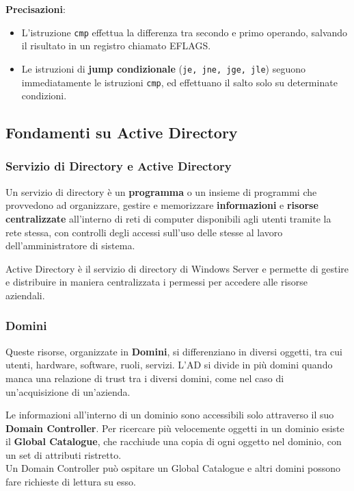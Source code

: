 \documentclass{article}
\begin{document}
\textbf{Precisazioni}:
\begin{itemize}
    \item L’istruzione \verb|cmp| effettua la differenza tra secondo e primo operando, salvando il risultato in un registro chiamato EFLAGS.
    \item  Le istruzioni di \textbf{jump condizionale} (\verb|je, jne, jge, jle|) seguono immediatamente le istruzioni \verb|cmp|, ed effettuano il salto solo su determinate condizioni.
\end{itemize}

\newpage

\subsection{Fondamenti su Active Directory}
\subsubsection{Servizio di Directory e Active Directory}
Un servizio di directory è un \textbf{programma} o un insieme di programmi che provvedono ad organizzare, gestire e memorizzare \textbf{informazioni} e \textbf{risorse centralizzate} all'interno di reti di computer disponibili agli utenti tramite la rete stessa, con controlli degli accessi sull'uso delle stesse al lavoro dell'amministratore di sistema.

Active Directory è il servizio di directory di Windows Server e permette di gestire e distribuire in maniera centralizzata i permessi per accedere alle risorse aziendali.

\subsubsection{Domini}
Queste risorse, organizzate in \textbf{Domini}, si differenziano in diversi oggetti, tra cui utenti, hardware, software, ruoli, servizi. L'AD si divide in più domini quando manca una relazione di trust tra i diversi domini, come nel caso di un'acquisizione di un'azienda.

Le informazioni all'interno di un dominio sono accessibili solo attraverso il suo \textbf{Domain Controller}. Per ricercare più velocemente oggetti in un dominio esiste il \textbf{Global Catalogue}, che racchiude una copia di ogni oggetto nel dominio, con un set di attributi ristretto.\\
Un Domain Controller può ospitare un Global Catalogue e altri domini possono fare richieste di lettura su esso.
\end{document}
